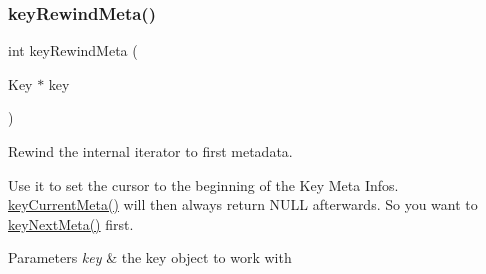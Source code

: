 \subsubsection{\texorpdfstring{keyRewindMeta()}{keyRewindMeta()}}
{\footnotesize\ttfamily int key\+Rewind\+Meta (\begin{DoxyParamCaption}\item[{Key $\ast$}]{key }\end{DoxyParamCaption})}



Rewind the internal iterator to first metadata. 

Use it to set the cursor to the beginning of the Key Meta Infos. \mbox{\hyperlink{group__keymeta_ga74a273f529030f4947df52e14fdd2869}{key\+Current\+Meta()}} will then always return N\+U\+LL afterwards. So you want to \mbox{\hyperlink{group__keymeta_ga4c88342f580a4291455a801af71ce048}{key\+Next\+Meta()}} first.


\begin{DoxyCode}{0}
\DoxyCodeLine{}
\DoxyCodeLine{\{}
\DoxyCodeLine{\}}
\end{DoxyCode}



\begin{DoxyParams}{Parameters}
{\em key} & the key object to work with \\
\hline
\end{DoxyParams}

